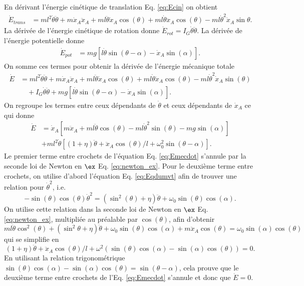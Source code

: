 \par\vspace{2mm}
En dérivant l'énergie cinétique de translation Eq. \eqref{eq:Ecin} on obtient
\begin{align}
    \dot E_{trans}&= ml^2\dot\theta\ddot\theta + m\dot x_A \ddot x_A +ml\ddot\theta \dot x_A \cos(\theta) + ml\dot\theta \ddot x_A \cos(\theta) - ml\dot\theta^2 \dot x_A \sin \theta.
\end{align}
La dérivée de l'énergie cinétique de rotation donne $\dot E_{rot}=I_G\dot\theta\ddot \theta$.
La dérivée de l'énergie potentielle donne
\begin{align}
    \dot E_{pot} &= mg\left[l\dot\theta \sin(\theta-\alpha) - \dot x_A\sin(\alpha)\right].
\end{align}
On somme ces termes pour obtenir la dérivée de l'énergie mécanique totale
\begin{align}
    \dot E &= ml^2\dot\theta\ddot\theta + m\dot x_A \ddot x_A +ml\ddot\theta \dot x_A \cos(\theta) + ml\dot\theta \ddot x_A \cos(\theta) - ml\dot\theta^2 \dot x_A \sin(\theta) \nonumber\\
    &\quad + I_G\dot\theta\ddot \theta + mg\left[l\dot\theta \sin(\theta-\alpha) - \dot x_A\sin(\alpha)\right].
\end{align}
On regroupe les termes entre ceux dépendants de $\dot\theta$ et ceux dépendants de $\dot x_A$ ce qui donne
\begin{align}
    \dot E &= \dot x_A \left[m\ddot x_A +ml\ddot\theta \cos(\theta) - ml\dot\theta^2 \sin(\theta) - mg\sin(\alpha)\right]\nonumber\\
    &+ ml^2 \dot \theta \left[(1+\eta)\ddot\theta + \ddot x_A \cos(\theta)/l + \omega_0^2\sin(\theta-\alpha)\right].
    \label{eq:Emecdot}
\end{align}
Le premier terme entre crochets de l'équation Eq. \eqref{eq:Emecdot} s'annule par la seconde loi de Newton en $\ex$ Eq. \eqref{eq:newton_ex}.
Pour le deuxième terme entre crochets, on utilise d'abord l'équation Eq. \eqref{eq:Eqdumvt} afin de trouver une relation pour $\dot\theta^2$, i.e.
$$
-\sin(\theta)\cos(\theta)\dot\theta^2 = (\sin^2(\theta)+\eta)\ddot\theta + \omega_0\sin(\theta)\cos(\alpha).
$$
On utilise cette relation dans la seconde loi de Newton en $\ex$ Eq. \eqref{eq:newton_ex}, multipliée au préalable par $\cos(\theta)$, afin d'obtenir
$$
ml\ddot\theta \cos^2(\theta) + (\sin^2\theta+\eta)\ddot\theta + \omega_0\sin(\theta)\cos(\alpha) + m \ddot x_A \cos(\theta) = \omega_0 \sin(\alpha)\cos(\theta) 
$$
qui se simplifie en 
$$
(1+\eta)\ddot\theta + \ddot x_A \cos(\theta)/l + \omega^2 (\sin(\theta)\cos(\alpha) - \sin(\alpha)\cos(\theta)) = 0.
$$
En utilisant la relation trigonométrique $\sin(\theta)\cos(\alpha) - \sin(\alpha)\cos(\theta)=\sin(\theta-\alpha)$, cela prouve que le deuxième terme entre crochets de l'Eq. \eqref{eq:Emecdot} s'annule et donc que $\dot E = 0$.



